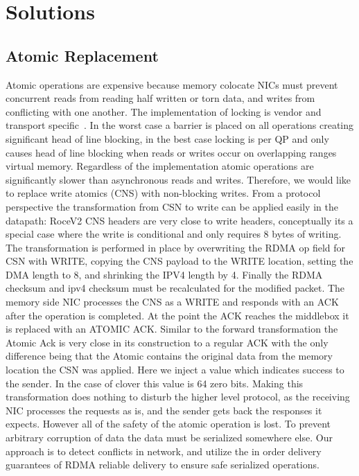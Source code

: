 \section{Solutions}


\subsection{Atomic Replacement} 

Atomic operations are expensive because memory colocate NICs must prevent
concurrent reads from reading half written or torn data, and writes from
conflicting with one another. The implementation of locking is vendor and
transport specific~\cite{design-guidelines}. In the worst case a barrier is
placed on all operations creating significant head of line blocking, in the best
case locking is per QP and only causes head of line blocking when reads or
writes occur on overlapping ranges virtual memory. Regardless of the
implementation atomic operations are significantly slower than asynchronous
reads and writes.
Therefore, we would like to replace write atomics (CNS) with non-blocking
writes. From a protocol perspective the transformation from CSN to write can be
applied easily in the datapath: RoceV2 CNS headers are very close to write
headers, conceptually its a special case where the write is conditional and only
requires 8 bytes of writing. The transformation is performed in place by
overwriting the RDMA op field for CSN with WRITE, copying the CNS payload to the
WRITE location, setting the DMA length to 8, and shrinking the IPV4 length by 4.
Finally the RDMA checksum and ipv4 checksum must be recalculated for the
modified packet.
The memory side NIC processes the CNS as a WRITE and responds with an ACK after
the operation is completed. At the point the ACK reaches the middlebox it is
replaced with an ATOMIC ACK. Similar to the forward transformation the Atomic
Ack is very close in its construction to a regular ACK with the only difference
being that the Atomic contains the original data from the memory location the
CSN was applied. Here we inject a value which indicates success to the sender.
In the case of clover this value is 64 zero bits.  Making this transformation
does nothing to disturb the higher level protocol, as the receiving NIC
processes the requests as is, and the sender gets back the responses it expects.
However all of the safety of the atomic operation is lost. To prevent arbitrary
corruption of data the data must be serialized somewhere else. Our approach is
to detect conflicts in network, and utilize the in order delivery guarantees of
RDMA reliable delivery to ensure safe serialized operations.

